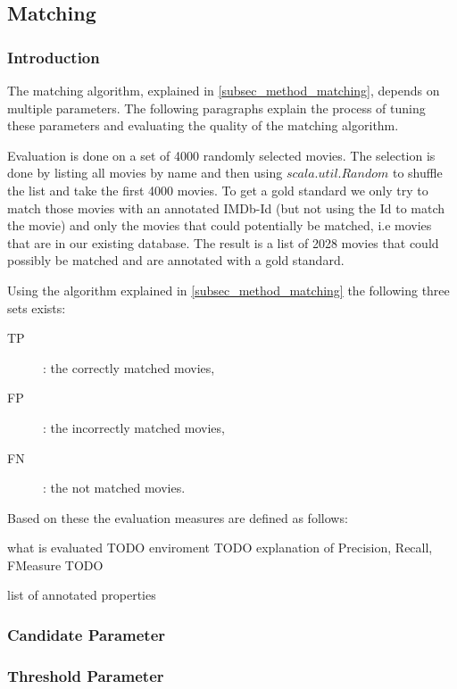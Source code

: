 \subsection{Matching}
\label{subsec_evaluation_matching}

\subsubsection{Introduction}
The matching algorithm, explained in \ref{subsec_method_matching}, depends on multiple parameters. The following paragraphs explain the process of tuning these parameters and evaluating the quality of the matching algorithm.

Evaluation is done on a set of 4000 randomly selected movies. The selection is done by listing all movies by name and then using $scala.util.Random$ to shuffle the list and take the first 4000 movies. To get a gold standard we only try to match those movies with an annotated IMDb-Id (but not using the Id to match the movie) and only the movies that could potentially be matched, i.e movies that are in our existing database. The result is a list of 2028 movies that could possibly be matched and are annotated with a gold standard.

Using the algorithm explained in \ref{subsec_method_matching} the following three sets exists:

\begin{description}
\item[TP]: the correctly matched movies,
\item[FP]: the incorrectly matched movies,
\item[FN]: the not matched movies.
\end{description}

Based on these the evaluation measures are defined as follows:



what is evaluated TODO
enviroment TODO
explanation of Precision, Recall, FMeasure TODO

list of annotated properties 

\subsubsection{Candidate Parameter}
\subsubsection{Threshold Parameter}